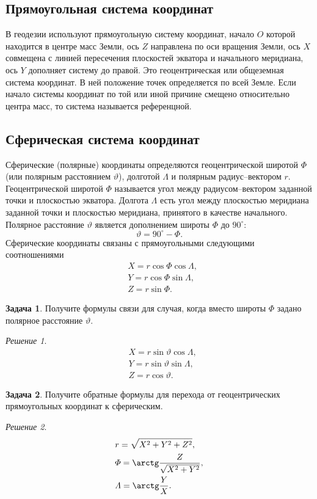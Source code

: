 \documentclass[11pt, a4paper]{article}
\theoremstyle{plain}
\theoremstyle{definition}
\newtheorem{problem}{Задача}[section]
\theoremstyle{remark}
\newtheorem*{solution}{Решение}
\renewcommand{\theta}{\vartheta}
\begin{document}
\subsection{Прямоугольная система координат}
В геодезии используют прямоугольную систему координат, начало $O$ которой находится в центре масс
Земли, ось $Z$ направлена по оси вращения Земли, ось $X$ совмещена с линией пересечения плоскостей
экватора и начального меридиана, ось $Y$ дополняет систему до правой\cite{Ogorodova2006}. 
Это геоцентрическая или общеземная система координат. В ней положение точек определяется по всей
Земле. Если начало системы координат по той или иной причине смещено относительно центра масс, то
система называется референцной.

\subsection{Сферическая система координат}

Сферические (полярные) координаты определяются геоцентрической широтой $\Phi$ (или полярным
расстоянием $\theta$), долготой $\Lambda$ и полярным радиус--вектором $r$.
Геоцентрической широтой $\Phi$ называется угол между радиусом--вектором заданной точки и плоскостью
экватора.
Долгота $\Lambda$ есть угол между
плоскостью меридиана заданной точки и плоскостью меридиана, принятого в качестве начального.
Полярное расстояние $\theta$ является дополнением широты $\Phi$ до $90^\circ$:
\begin{equation*}
    \theta = 90^\circ - \Phi.
\end{equation*}
Сферические координаты связаны с прямоугольными следующими соотношениями
\begin{align*}
    &X = r\cos\Phi\cos\Lambda,\\
    &Y = r\cos\Phi\sin\Lambda,\\
    &Z = r\sin\Phi.
\end{align*}
\begin{problem}
Получите формулы связи для случая, когда вместо широты $\Phi$ задано полярное расстояние $\theta$.
\end{problem}
\begin{solution}
\begin{align*}
    &X = r\sin\theta\cos\Lambda,\\
    &Y = r\sin\theta\sin\Lambda,\\
    &Z = r\cos\theta.
\end{align*}
\end{solution}
\begin{problem}
    Получите обратные формулы для перехода от геоцентрических прямоугольных координат к сферическим.
\end{problem}
\begin{solution}
\begin{align*}
    &r = \sqrt{X^2 + Y^2 + Z^2},\\
    &\Phi = \arctg\dfrac{Z}{\sqrt{X^2 + Y^2}},\\
    &\Lambda = \arctg\dfrac{Y}{X}.
\end{align*}
\end{solution}
\end{document}
